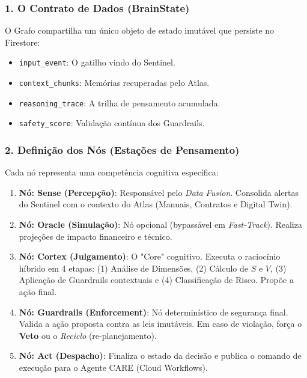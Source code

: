 \documentclass[12pt, a4paper]{article}
\begin{document}
\subsubsection{1. O Contrato de Dados (BrainState)}
O Grafo compartilha um único objeto de estado imutável que persiste no Firestore:
\begin{itemize}
    \item \texttt{input\_event}: O gatilho vindo do Sentinel.
    \item \texttt{context\_chunks}: Memórias recuperadas pelo Atlas.
    \item \texttt{reasoning\_trace}: A trilha de pensamento acumulada.
    \item \texttt{safety\_score}: Validação contínua dos Guardrails.
\end{itemize}

\subsubsection{2. Definição dos Nós (Estações de Pensamento)}
Cada nó representa uma competência cognitiva específica:

\begin{enumerate}
    \item \textbf{Nó: Sense (Percepção)}: Responsável pelo \textit{Data Fusion}. Consolida alertas do Sentinel com o contexto do Atlas (Manuais, Contratos e Digital Twin).
    \item \textbf{Nó: Oracle (Simulação)}: Nó opcional (bypassável em \textit{Fast-Track}). Realiza projeções de impacto financeiro e técnico.
    \item \textbf{Nó: Cortex (Julgamento)}: O "Core" cognitivo. Executa o raciocínio híbrido em 4 etapas: (1) Análise de Dimensões, (2) Cálculo de $S$ e $V$, (3) Aplicação de Guardrails contextuais e (4) Classificação de Risco. Propõe a ação final.
    \item \textbf{Nó: Guardrails (Enforcement)}: Nó determinístico de segurança final. Valida a ação proposta contra as leis imutáveis. Em caso de violação, força o \textbf{Veto} ou o \textit{Reciclo} (re-planejamento).
    \item \textbf{Nó: Act (Despacho)}: Finaliza o estado da decisão e publica o comando de execução para o Agente CARE (Cloud Workflows).
\end{enumerate}
\end{document}
